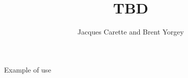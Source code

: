 \documentclass{jfp1}
\begin{document}
\title{TBD}
\author{Jacques Carette and Brent Yorgey}

\maketitle

Example of use
\end{document}
